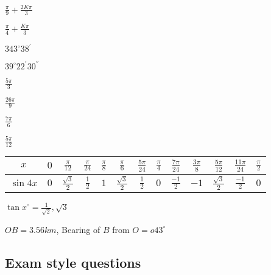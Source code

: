 \documentclass{article}
\begin{document}
\begin{enumerate}[label=Q\arabic*)]
\begin{enumerate*}[label=\alph*)]
          \item $\frac{\pi}{9}+\frac{2K\pi}{3}$
          \item $\frac{\pi}{4}+\frac{K\pi}{3}$
        \end{enumerate*}
  \item[Q25)]
        \begin{enumerate*}[label=\alph*)]
          \item
          \begin{enumerate*}[label=\roman*)]
            \item $343^{\circ}38^{'}$
            \item $39^{\circ}22^{'}30^{''}$
          \end{enumerate*}
          \item
          \begin{enumerate*}[label=\roman*)]
            \item $\frac{5\pi}{3}$
            \item $\frac{26\pi}{9}$
            \item $\frac{7\pi}{6}$
            \item $\frac{5\pi}{12}$
          \end{enumerate*}
        \end{enumerate*}
  \item[Q26)]
        \begin{tabular}{|c|c|c|c|c|c|c|c|c|c|c|c|c|}
          \hline
          $x$ & $0$ & $\frac{\pi}{12}$ & $\frac{\pi}{24}$ & $\frac{\pi}{8}$ & $\frac{\pi}{6}$ & $\frac{5\pi}{24}$ & $\frac{\pi}{4}$ & $\frac{7\pi}{24}$ & $\frac{3\pi}{8}$ & $\frac{5\pi}{12}$ & $\frac{11\pi}{24}$ & $\frac{\pi}{2}$ \\[3pt]
          \hline
          $\sin 4x$ & $0$ & $\frac{\sqrt{3}}{2}$ & $\frac{1}{2}$ & $1$ & $\frac{\sqrt{3}}{2}$ & $\frac{1}{2}$ & $0$ & $\frac{-1}{2}$ & $-1$ & $\frac{\sqrt{3}}{2}$ & $\frac{-1}{2}$ & $0$ \\
          \hline
        \end{tabular}
  \item[Q27)] $\tan x^{\circ} = \frac{1}{\sqrt{2}}, \sqrt{3}$
  \item[Q28)] $OB = 3.56km$, Bearing of $B$ from $O = o43^{\circ}$

\end{enumerate}

\subsection {Exam style questions}
\end{document}
